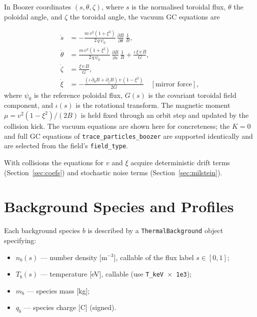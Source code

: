 \documentclass[11pt]{article}
\begin{document}
In Boozer coordinates $(s,\theta,\zeta)$, where $s$ is the normalised toroidal flux,
$\theta$ the poloidal angle, and $\zeta$ the toroidal angle, the vacuum GC equations are

\begin{align}
  \dot s &= -\frac{m\,v^2(1+\xi^2)}{2\,q\,\psi_0}\,\frac{\partial B}{\partial\theta}\,\frac{1}{B},
  \\[4pt]
  \dot\theta &= \frac{m\,v^2(1+\xi^2)}{2\,q\,\psi_0}\,\frac{\partial B}{\partial s}\,\frac{1}{B}
               + \frac{\iota\,\xi\,v\,B}{G},
  \\[4pt]
  \dot\zeta &= \frac{\xi\,v\,B}{G},
  \\[4pt]
  \dot\xi &= -\frac{(\iota\,\partial_\theta B + \partial_\zeta B)\,v\,(1-\xi^2)}{2G}
             \quad[\text{mirror force}],
\end{align}
where $\psi_0$ is the reference poloidal flux, $G(s)$ is the covariant toroidal
field component, and $\iota(s)$ is the rotational transform.  The magnetic moment
$\mu = v^2(1-\xi^2)/(2B)$ is held fixed through an orbit step and updated by the
collision kick.  The vacuum equations are shown here for concreteness; the $K=0$ and
full GC equations of \texttt{trace\_particles\_boozer} are supported identically and
are selected from the field's \texttt{field\_type}.

With collisions the equations for $v$ and $\xi$ acquire deterministic drift terms
(Section~\ref{sec:coefs}) and stochastic noise terms (Section~\ref{sec:milstein}).

\section{Background Species and Profiles}

Each background species $b$ is described by a \texttt{ThermalBackground} object
specifying:
\begin{itemize}
  \item $n_b(s)$ --- number density [m$^{-3}$], callable of the flux label $s\in[0,1]$;
  \item $T_b(s)$ --- temperature [eV], callable (use \texttt{T\_keV $\times$ 1e3});
  \item $m_b$ --- species mass [kg];
  \item $q_b$ --- species charge [C] (signed).
\end{itemize}
\end{document}
